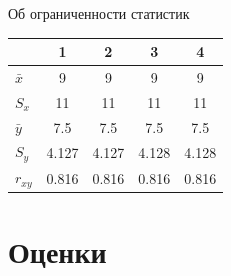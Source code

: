 \documentclass[9pt,pdf,utf8,hyperref={unicode},aspectratio=169]{beamer}
\begin{document}
\begin{frame}{Об ограниченности статистик}
{		\bigskip
		
		\begin{center}
			\begin{tabular}{|l|cccc|}
				\hline
				\text{№}& 1    & 2    & 3    & 4    \\ \hline
				$\bar{x}$ & 9    & 9    & 9    & 9    \\ \hline
				$S_x$   & 11   & 11   & 11   & 11   \\ \hline
				$\bar{y}$ & 7.5  & 7.5  & 7.5  & 7.5  \\ \hline
				$S_y$    & 4.127& 4.127& 4.128& 4.128\\ \hline
				$r_{xy}$  & 0.816& 0.816& 0.816& 0.816\\ \hline
			\end{tabular}
		\end{center}
	}
	
\end{frame}

\section{Оценки}
\end{document}
